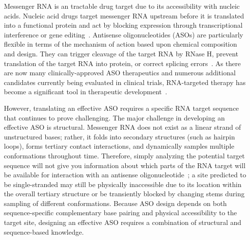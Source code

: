 
Messenger RNA is an tractable drug target due to its accessibility with nucleic acids. Nucleic acid drugs target messenger RNA upstream before it is translated into a functional protein and act by blocking expression through transcriptional interference or gene editing~\cite{Crooke2021, Rinaldi2018}. Antisense oligonucleotides (ASOs) are particularly flexible in terms of the mechanism of action based upon chemical composition and design. They can trigger cleavage of the target RNA by RNase H, prevent translation of the target RNA into protein, or correct splicing errors~\cite{Bennett2019}. As there are now many clinically-approved ASO therapeutics and numerous additional candidates currently being evaluated in clinical trials, RNA-targeted therapy has become a significant tool in therapeutic development~\cite{Crooke2021}.

However, translating an effective ASO requires a specific RNA target sequence that continues to prove challenging. The major challenge in developing an effective ASO is structural. Messenger RNA does not exist as a linear strand of unstructured bases; rather, it folds into secondary structures (such as hairpin loops), forms tertiary contact interactions, and dynamically samples multiple conformations throughout time. Therefore, simply analyzing the potential target sequence will not give you information about which parts of the RNA target will be available for interaction with an antisense oligonucleotide~\cite{Watts2009, Liang2011}; a site predicted to be single-stranded may still be physically inaccessible due to its location within the overall tertiary structure or be transiently blocked by changing stems during sampling of different conformations. Because ASO design depends on both sequence-specific complementary base pairing and physical accessibility to the target site, designing an effective ASO requires a combination of structural and sequence-based knowledge.

